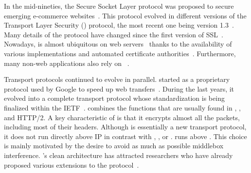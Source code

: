 
In the mid-nineties, the Secure Socket Layer protocol was proposed to secure
emerging e-commerce websites~\cite{draft-hickman-netscape-ssl}. This protocol
evolved in different versions of the Transport Layer Security (\tls) protocol, the most recent one being version 1.3~\cite{rfc8446}. Many details of the \tls protocol have changed since the first version of SSL~\cite{kotzias2018coming}. Nowadays, \tls is almost ubiquitous on web servers~\cite{holz2019era} thanks to the availability of various \tls implementations and automated certificate authorities~\cite{aas2019let}. Furthermore, many non-web applications also rely on \tls~\cite{anderson2019tls}.


Transport protocols continued to evolve in parallel. \quic started as
a proprietary protocol used by Google to speed up web
transfers~\cite{roskind2013quic,langley2017quic}. During the last years, it evolved into a complete transport protocol whose standardization is being finalized within the IETF~\cite{draft-ietf-quic-transport}. \quic combines the
functions that are usually found in \tcp, \tls, and HTTP/2. A key characteristic
of \quic is that it encrypts almost all the packets, including most of their headers. Although \quic is essentially a new transport protocol, it does not run
directly above IP in contrast with \sctp, \tcp, or \dccp. \quic runs above \udp. This choice is mainly motivated by the desire to avoid as much as possible
middlebox interference. \quic's clean architecture has attracted researchers
who have already proposed various extensions to the protocol~\cite{de2019pluginizing,viernickel2018multipath,polese2019survey,michel2019quic,draft-huitema-quic-ts,draft-shi-quic-dtp,draft-swett-nwcrg-coding-for-quic}.

